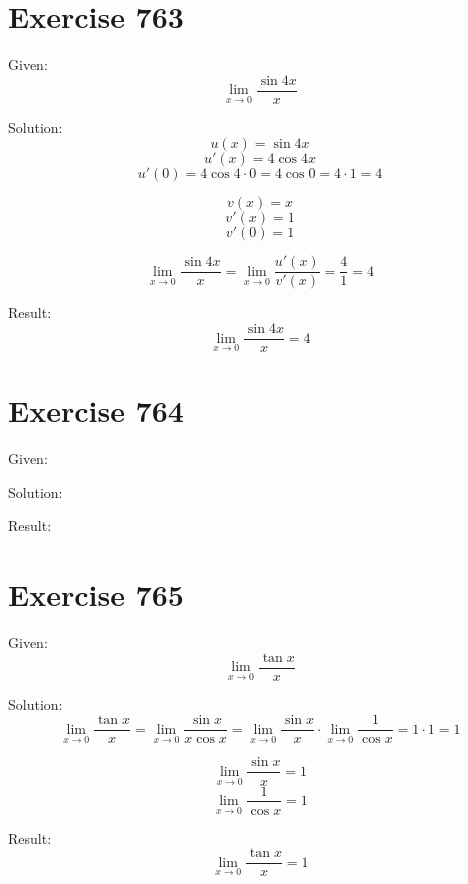 \documentclass[a4paper, 10pt]{scrartcl}
\begin{document}
\section{Exercise 763}

Given:
\[\lim_{x\to 0}{\frac{\sin{4x}}{x}}\]

Solution:
\[u(x) = \sin{4x}\]
\[u'(x) = 4\cos{4x}\]
\[u'(0) = 4\cos{4\cdot 0} = 4\cos{0} = 4\cdot 1 = 4\]

\[v(x) = x\]
\[v'(x) = 1\]
\[v'(0) = 1\]

\[\lim_{x\to 0}{\frac{\sin{4x}}{x}} = \lim_{x\to 0}{\frac{u'(x)}{v'(x)}} = \frac{4}{1} = 4\]

Result:
\[\lim_{x\to 0}{\frac{\sin{4x}}{x}} = 4\]

\section{Exercise 764}

Given:

Solution:

Result:

\section{Exercise 765}

Given:
\[\lim_{x\to 0}{\frac{\tan{x}}{x}}\]

Solution:
\[\lim_{x\to 0}{\frac{\tan{x}}{x}} = \lim_{x\to 0}{\frac{\sin{x}}{x\cos{x}}} =
\lim_{x\to 0}{\frac{\sin{x}}{x}}\cdot\lim_{x\to 0}{\frac{1}{\cos{x}}} = 1\cdot 1 = 1\]

\[\lim_{x\to 0}{\frac{\sin{x}}{x}} = 1\]
\[\lim_{x\to 0}{\frac{1}{\cos{x}}} = 1\]

Result:
\[\lim_{x\to 0}{\frac{\tan{x}}{x}} = 1\]
\end{document}
